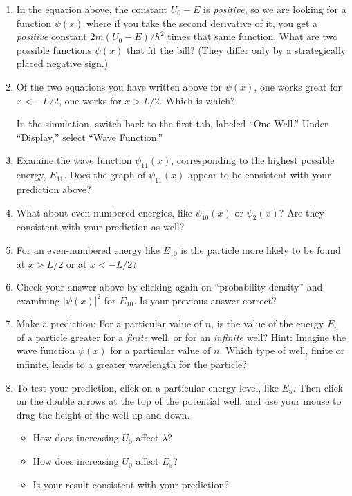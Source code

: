 \begin{enumerate}[wide]
\item In the equation above, the constant $U_0 - E$ is \textit{positive}, so we are looking for a function $\psi(x)$ where if you take the second derivative of it, you get a \textit{positive} constant $2m(U_0 - E) / \hbar^2$ times that same function. What are two possible functions $\psi(x)$ that fit the bill?  (They differ only by a strategically placed negative sign.) 
\answerspace{0.6in}

\item Of the two equations you have written above for $\psi(x)$, one works great for $x < -L/2$, one works for $x > L/2$. Which is which?
\answerspace{0.6in}

In the simulation, switch back to the first tab, labeled ``One Well.''  Under ``Display,'' select ``Wave Function.''  

\item Examine the wave function $\psi_{11}(x)$, corresponding to the highest possible energy, $E_{11}$.  Does the graph of $\psi_{11}(x)$ appear to be consistent with your prediction above? 
\answerspace{0.6in}

\item What about even-numbered energies, like $\psi_{10}(x)$ or $\psi_{2}(x)$?  Are they consistent with your prediction as well?
\answerspace{0.6in}

\item For an even-numbered energy like $E_{10}$ is the particle more likely to be found at $x > L/2$ or at $x < -L/2$?
\answerspace{0.6in}

\item Check your answer above by clicking again on ``probability density'' and examining $\left| \psi(x) \right|^2$ for $E_{10}$.  Is your previous answer correct?
\answerspace{0.6in}

\pagebreak[3]

\item Make a prediction: For a particular value of $n$, is the value of the energy $E_n$ of a particle greater for a \textit{finite} well, or for an \textit{infinite} well?  Hint: Imagine the wave function $\psi(x)$ for a particular value of $n$.  Which type of well, finite or infinite, leads to a greater wavelength for the particle?
\answerspace{0.8in}

\item To test your prediction, click on a particular energy level, like $E_5$.  Then click on the double arrows at the top of the potential well, and use your mouse to drag the height of the well up and down.  

\begin{itemize}
\item How does increasing $U_0$ affect $\lambda$?  
\answerspace{0.5in}

\item How does increasing $U_0$ affect $E_5$?  
\answerspace{0.5in}

\item Is your result consistent with your prediction?
\answerspace{0.5in}

\end{itemize}
\end{enumerate}
